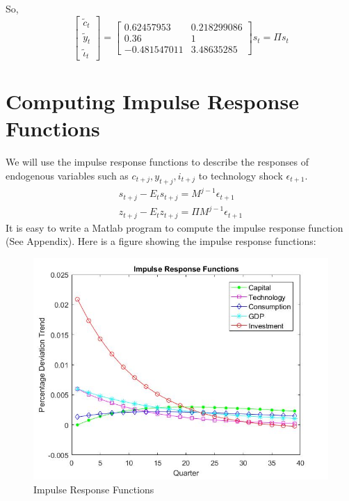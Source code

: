 \documentclass{article}
\begin{document}
So,
$$\left[\begin{array}{c} \tilde c_{t} \\ \tilde y_{t} \\ \tilde \iota_{t} \end{array}\right]=
\left[\begin{array}{cc} 0.62457953 & 0.218299086 \\ 0.36 & 1 \\ -0.481547011 & 3.48635285 \end{array}\right] s_t
=\Pi s_t$$

\newpage
\section{Computing Impulse Response Functions}
We will use the impulse response functions to describe the responses of endogenous
variables such as $c_{t+j}, y_{t+j} , i_{t+j}$ to technology shock $\epsilon_{t+1}$.
\begin{eqnarray}
    s_{t+j}-E_t s_{t+j} = M^{j-1}\epsilon_{t+1} \\ 
    z_{t+j}-E_t z_{t+j} = \Pi M^{j-1}\epsilon_{t+1}
\end{eqnarray}
It is easy to write a Matlab program to compute the impulse response function (See Appendix).
Here is a figure showing the impulse response functions:
\begin{figure}[ht]
    \centering
    \includegraphics[width=1\textwidth]{1.jpg}
    \caption{Impulse Response Functions}
    \label{fig:1}
\end{figure}

\newpage
\end{document}
